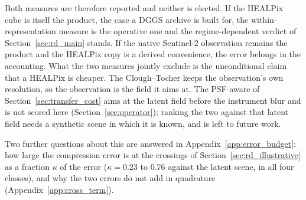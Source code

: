 Both measures are therefore reported and neither is elected. If the
HEALPix cube is itself the product, the case a DGGS archive is built for,
the within-representation measure is the operative one and the
regime-dependent verdict of Section~\ref{sec:rd_main} stands. If the
native Sentinel-2 observation remains the  product and the
HEALPix copy is a derived
convenience, the  error belongs in the accounting. What the two measures jointly
exclude is the unconditional claim that a HEALPix  is cheaper.
The Clough--Tocher  keeps the observation's own
resolution, so the observation is the field it aims at. The PSF-aware
 of Section~\ref{sec:transfer_cost} aims at the latent
field before the instrument blur and is not scored here
(Section~\ref{sec:operator}); ranking the two  against
that latent field needs a synthetic scene in which it is known, and is
left to future work.

Two further questions about this  are answered in
Appendix~\ref{app:error_budget}: how large the compression error is at
the crossings of Section~\ref{sec:rd_illustrative} as a fraction
$\kappa$ of the  error ($\kappa=0.23$ to $0.76$ against
the latent scene, in all four classes), and why the two errors do not
add in quadrature (Appendix~\ref{app:cross_term}).
